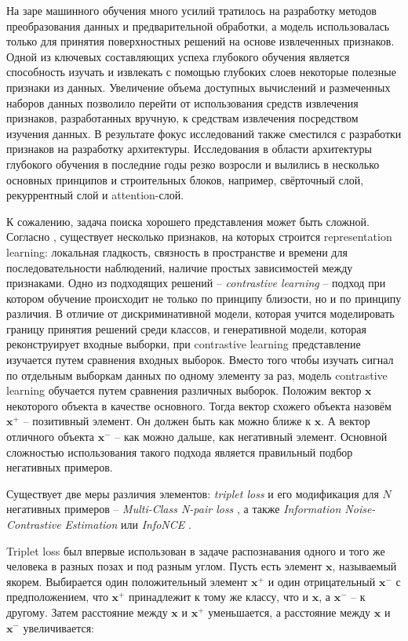 \documentclass[a4paper, 12pt]{article}
\begin{document}
На заре машинного обучения много усилий тратилось на разработку методов преобразования данных и предварительной обработки, а модель использовалась только для принятия поверхностных решений на основе извлеченных признаков. Одной из ключевых составляющих успеха глубокого обучения является способность изучать и извлекать с помощью глубоких слоев некоторые полезные признаки из данных. Увеличение объема доступных вычислений и размеченных наборов данных позволило перейти от использования средств извлечения признаков, разработанных вручную, к средствам извлечения посредством изучения данных. В результате фокус исследований также сместился с разработки признаков на разработку архитектуры. Исследования в области архитектуры глубокого обучения в последние годы резко возросли и вылились в несколько основных принципов и строительных блоков, например, свёрточный слой, рекуррентный слой и attention-слой.

К сожалению, задача поиска хорошего представления может быть сложной. Согласно \citep{LeKhac2020}, существует несколько признаков, на которых строится representation learning: локальная гладкость, связность в пространстве и времени для последовательности наблюдений, наличие простых зависимостей между признаками. Одно из подходящих решений -- \textit{contrastive learning} -- подход при котором обучение происходит не только по принципу близости, но и по принципу различия. В отличие от дискриминативной модели, которая учится моделировать границу принятия решений среди классов, и генеративной модели, которая реконструирует входные выборки, при contrastive learning представление изучается путем сравнения входных выборок. Вместо того чтобы изучать сигнал по отдельным выборкам данных по одному элементу за раз, модель contrastive learning обучается путем сравнения различных выборок. Положим вектор $\textbf{x}$ некоторого объекта в качестве основного. Тогда вектор схожего объекта назовём $\textbf{x}^+$ -- позитивный элемент. Он должен быть как можно ближе к $\textbf{x}$. А вектор отличного объекта $\textbf{x}^-$ -- как можно дальше, как негативный элемент. Основной сложностью использования такого подхода является правильный подбор негативных примеров.

Существует две меры различия элементов: \textit{triplet loss} \citep{Schroff2015} и его модификация для $N$ негативных примеров -- \textit{Multi-Class N-pair loss} \citep{Sohn2016ImprovedDM}, а также \textit{Information Noise-Contrastive Estimation} или \textit{InfoNCE} \citep{Oord2018RepresentationLW}.

Triplet loss был впервые использован в задаче распознавания одного и того же человека в разных позах и под разным углом. Пусть есть элемент $\mathbf{x}$, называемый якорем. Выбирается один положительный элемент $\textbf{x}^+$ и один отрицательный $\textbf{x}^-$ с предположением, что $\textbf{x}^+$ принадлежит к тому же классу, что и $\mathbf{x}$, а $\mathbf{x}^-$ -- к другому. Затем расстояние между $\mathbf{x}$ и $\mathbf{x}^+$ уменьшается, а расстояние между $\mathbf{x}$ и $\mathbf{x}^-$ увеличивается:
\end{document}
